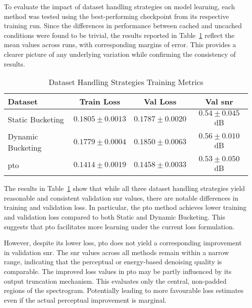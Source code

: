 To evaluate the impact of dataset handling strategies on model learning, each method was tested using the best-performing checkpoint from its respective training run. Since the differences in performance between cached and uncached conditions were found to be trivial, the results reported in Table~\ref{tab:dataset_performance} reflect the mean values across runs, with corresponding margins of error. This provides a clearer picture of any underlying variation while confirming the consistency of results.

\vspace{1em}
\begin{table}[H]
\centering
\caption{Dataset Handling Strategies Training Metrics}
\label{tab:dataset_performance}
\begin{tabular}{|l|c|c|c|}
\hline
\textbf{Dataset} & \textbf{Train Loss} & \textbf{Val Loss} & \textbf{Val \gls{snr}} \\
\hline
Static Bucketing  & \(0.1805 \pm 0.0013\)  & \(0.1787 \pm 0.0020\)  & \(0.54 \pm 0.045\) dB \\
Dynamic Bucketing & \(0.1779 \pm 0.0004\)  & \(0.1850 \pm 0.0063\)  & \(0.56 \pm 0.010\) dB \\
\gls{pto}               & \(0.1414 \pm 0.0019\)  & \(0.1458 \pm 0.0033\)  & \(0.53 \pm 0.050\) dB \\
\hline
\end{tabular}
\end{table}

The results in Table~\ref{tab:dataset_performance} show that while all three dataset handling strategies yield reasonable and consistent validation \gls{snr} values, there are notable differences in training and validation loss. In particular, the \gls{pto} method achieves lower training and validation loss compared to both Static and Dynamic Bucketing. This suggests that \gls{pto} facilitates more learning under the current loss formulation.

However, despite its lower loss, \gls{pto} does not yield a corresponding improvement in validation \gls{snr}. The \gls{snr} values across all methods remain within a narrow range, indicating that the perceptual or energy-based denoising quality is comparable. The improved loss values in \gls{pto} may be partly influenced by its output truncation mechanism. This evaluates only the central, non-padded regions of the spectrogram. Potentially leading to more favourable loss estimates even if the actual perceptual improvement is marginal.

